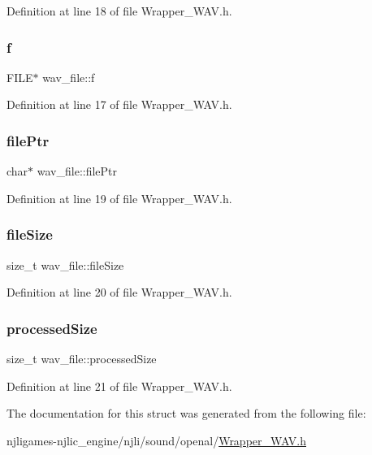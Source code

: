 Definition at line 18 of file Wrapper\+\_\+\+W\+A\+V.\+h.

\mbox{\label{structwav__file_a6c9f1ab95d2d33cd281db66512fa8132}} 
\subsubsection{\texorpdfstring{f}{f}}
{\footnotesize\ttfamily F\+I\+LE$\ast$ wav\+\_\+file\+::f}



Definition at line 17 of file Wrapper\+\_\+\+W\+A\+V.\+h.

\mbox{\label{structwav__file_a1d05305462c7031096e5a57cba20a329}} 
\subsubsection{\texorpdfstring{file\+Ptr}{filePtr}}
{\footnotesize\ttfamily char$\ast$ wav\+\_\+file\+::file\+Ptr}



Definition at line 19 of file Wrapper\+\_\+\+W\+A\+V.\+h.

\mbox{\label{structwav__file_a8607accef1ceb2d143e91e4468e1ca47}} 
\subsubsection{\texorpdfstring{file\+Size}{fileSize}}
{\footnotesize\ttfamily size\+\_\+t wav\+\_\+file\+::file\+Size}



Definition at line 20 of file Wrapper\+\_\+\+W\+A\+V.\+h.

\mbox{\label{structwav__file_ac0b004bf1255fa2ea5d4a41316a4253d}} 
\subsubsection{\texorpdfstring{processed\+Size}{processedSize}}
{\footnotesize\ttfamily size\+\_\+t wav\+\_\+file\+::processed\+Size}



Definition at line 21 of file Wrapper\+\_\+\+W\+A\+V.\+h.



The documentation for this struct was generated from the following file\+:\begin{DoxyCompactItemize}
\item 
njligames-\/njlic\+\_\+engine/njli/sound/openal/\mbox{\hyperlink{_wrapper___w_a_v_8h}{Wrapper\+\_\+\+W\+A\+V.\+h}}\end{DoxyCompactItemize}
